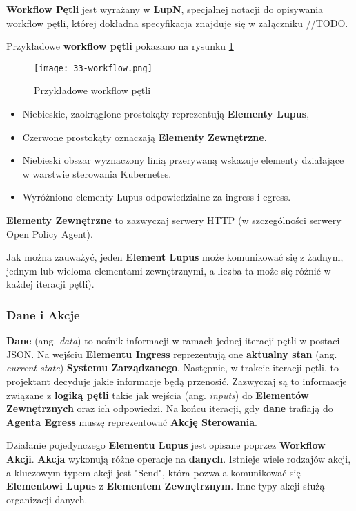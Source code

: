 \textbf{Workflow Pętli} jest wyrażany w \textbf{LupN}, specjalnej notacji do opisywania workflow pętli, której dokładna specyfikacja znajduje się w załączniku //TODO.

Przykładowe \textbf{workflow pętli} pokazano na rysunku \ref{fig:33-workflow}

\begin{figure}[!h]
    \centering \texttt{[image: 33-workflow.png]}
    \caption{Przykładowe workflow pętli}\label{fig:33-workflow}
\end{figure}

\begin{itemize}
    \item Niebieskie, zaokrąglone prostokąty reprezentują \textbf{Elementy Lupus},
    \item Czerwone prostokąty oznaczają \textbf{Elementy Zewnętrzne}.
    \item Niebieski obszar wyznaczony linią przerywaną wskazuje elementy działające w warstwie sterowania Kubernetes. 
    \item Wyróżniono elementy Lupus odpowiedzialne za ingress i egress.
\end{itemize}

\textbf{Elementy Zewnętrzne} to zazwyczaj serwery HTTP (w szczególności serwery Open Policy Agent).

Jak można zauważyć, jeden \textbf{Element Lupus} może komunikować się z żadnym, jednym lub wieloma elementami zewnętrznymi, a liczba ta może się różnić w każdej iteracji pętli).

\subsubsection{Dane i Akcje}

\textbf{Dane} (ang. \textit{data}) to nośnik informacji w ramach jednej iteracji pętli w postaci JSON. Na wejściu \textbf{Elementu Ingress} reprezentują one \textbf{aktualny stan} (ang. \textit{current state}) \textbf{Systemu Zarządzanego}. Następnie, w trakcie iteracji pętli, to projektant decyduje jakie informacje będą przenosić. Zazwyczaj są to informacje związane z \textbf{logiką pętli} takie jak wejścia (ang. \textit{inputs}) do \textbf{Elementów Zewnętrznych} oraz ich odpowiedzi. Na końcu iteracji, gdy \textbf{dane} trafiają do \textbf{Agenta Egress} muszę reprezentować \textbf{Akcję Sterowania}. 

Działanie pojedynczego \textbf{Elementu Lupus} jest opisane poprzez \textbf{Workflow Akcji}. \textbf{Akcja} wykonują różne operacje na \textbf{danych}. Istnieje wiele rodzajów akcji, a kluczowym typem akcji jest "Send", która pozwala komunikować się \textbf{Elementowi Lupus} z \textbf{Elementem Zewnętrznym}. Inne typy akcji służą organizacji danych.

